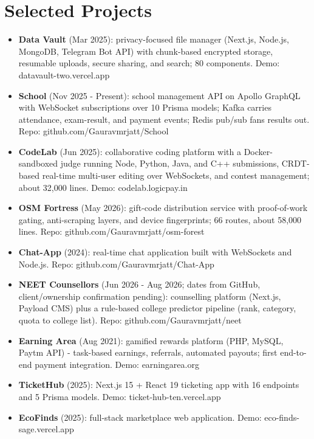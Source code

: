 \documentclass[11pt,a4paper,sans]{moderncv}
\begin{document}
\section{Selected Projects}
\vspace{1pt}
\begin{itemize}
    \item {\textbf{Data Vault} (Mar 2025): privacy-focused file manager (Next.js, Node.js, MongoDB, Telegram Bot API) with chunk-based encrypted storage, resumable uploads, secure sharing, and search; 80 components. Demo: datavault-two.vercel.app}
    \item {\textbf{School} (Nov 2025 - Present): school management API on Apollo GraphQL with WebSocket subscriptions over 10 Prisma models; Kafka carries attendance, exam-result, and payment events; Redis pub/sub fans results out. Repo: github.com/Gauravmrjatt/School}
    \item {\textbf{CodeLab} (Jun 2025): collaborative coding platform with a Docker-sandboxed judge running Node, Python, Java, and C++ submissions, CRDT-based real-time multi-user editing over WebSockets, and contest management; about 32,000 lines. Demo: codelab.logicpay.in}
    \item {\textbf{OSM Fortress} (May 2026): gift-code distribution service with proof-of-work gating, anti-scraping layers, and device fingerprints; 66 routes, about 58,000 lines. Repo: github.com/Gauravmrjatt/osm-forest}
    \item {\textbf{Chat-App} (2024): real-time chat application built with WebSockets and Node.js. Repo: github.com/Gauravmrjatt/Chat-App}
    \item {\textbf{NEET Counsellors} (Jun 2026 - Aug 2026; dates from GitHub, client/ownership confirmation pending): counselling platform (Next.js, Payload CMS) plus a rule-based college predictor pipeline (rank, category, quota to college list). Repo: github.com/Gauravmrjatt/neet}
    \item {\textbf{Earning Area} (Aug 2021): gamified rewards platform (PHP, MySQL, Paytm API) - task-based earnings, referrals, automated payouts; first end-to-end payment integration. Demo: earningarea.org}
    \item {\textbf{TicketHub} (2025): Next.js 15 + React 19 ticketing app with 16 endpoints and 5 Prisma models. Demo: ticket-hub-ten.vercel.app}
    \item {\textbf{EcoFinds} (2025): full-stack marketplace web application. Demo: eco-finds-sage.vercel.app}
\end{itemize}
\end{document}
